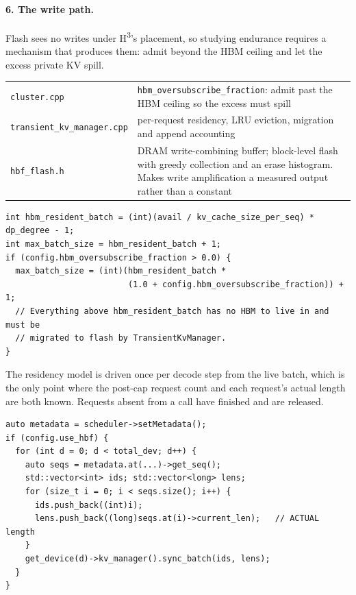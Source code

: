 \documentclass[11pt,a4paper]{article}
\newcommand{\code}[1]{\texttt{#1}}
\begin{document}
\paragraph{6. The write path.}
Flash sees no writes under H\textsuperscript{3}'s placement, so studying
endurance requires a mechanism that produces them: admit beyond the HBM ceiling
and let the excess private KV spill.

\begin{center}\small
\begin{tabular}{@{}p{5.0cm}p{9.3cm}@{}}
\toprule
\code{cluster.cpp} & \code{hbm\_oversubscribe\_fraction}: admit past the HBM
  ceiling so the excess must spill \\
\code{transient\_kv\_manager.cpp} & per-request residency, LRU eviction,
  migration and append accounting \\
\code{hbf\_flash.h} & DRAM write-combining buffer; block-level flash with
  greedy collection and an erase histogram. Makes write amplification a
  measured output rather than a constant \\
\bottomrule
\end{tabular}
\end{center}

\begin{lstlisting}[caption={\code{cluster.cpp} --- admitting past the HBM ceiling forces a spill},captionpos=b]
int hbm_resident_batch = (int)(avail / kv_cache_size_per_seq) * dp_degree - 1;
int max_batch_size = hbm_resident_batch + 1;
if (config.hbm_oversubscribe_fraction > 0.0) {
  max_batch_size = (int)(hbm_resident_batch *
                         (1.0 + config.hbm_oversubscribe_fraction)) + 1;
  // Everything above hbm_resident_batch has no HBM to live in and must be
  // migrated to flash by TransientKvManager.
}
\end{lstlisting}

The residency model is driven once per decode step from the live batch, which is
the only point where the post-cap request count and each request's actual length
are both known. Requests absent from a call have finished and are released.

\begin{lstlisting}[caption={\code{cluster.cpp} --- driving residency from the live batch each step},captionpos=b]
auto metadata = scheduler->setMetadata();
if (config.use_hbf) {
  for (int d = 0; d < total_dev; d++) {
    auto seqs = metadata.at(...)->get_seq();
    std::vector<int> ids; std::vector<long> lens;
    for (size_t i = 0; i < seqs.size(); i++) {
      ids.push_back((int)i);
      lens.push_back((long)seqs.at(i)->current_len);   // ACTUAL length
    }
    get_device(d)->kv_manager().sync_batch(ids, lens);
  }
}
\end{lstlisting}
\end{document}
